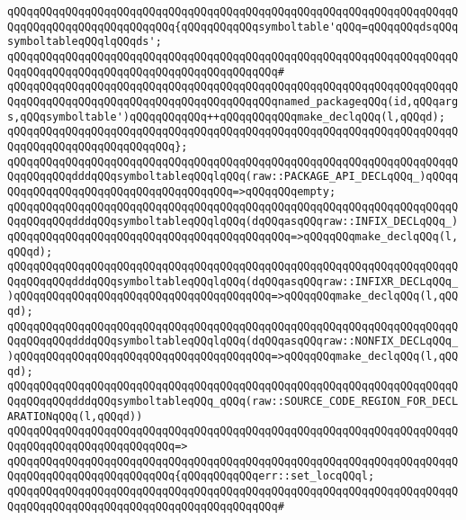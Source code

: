 \verb|qQQqqQQqqQQqqQQqqQQqqQQqqQQqqQQqqQQqqQQqqQQqqQQqqQQqqQQqqQQqqQQqqQQqqQQqqQQqqQQqqQQqqQQqqQQqqQQq{qQQqqQQqqQQqsymboltable'qQQq=qQQqqQQqdsqQQqsymboltableqQQqlqQQqds';|\newline
\verb|qQQqqQQqqQQqqQQqqQQqqQQqqQQqqQQqqQQqqQQqqQQqqQQqqQQqqQQqqQQqqQQqqQQqqQQqqQQqqQQqqQQqqQQqqQQqqQQqqQQqqQQqqQQqqQQq#|\newline
\verb|qQQqqQQqqQQqqQQqqQQqqQQqqQQqqQQqqQQqqQQqqQQqqQQqqQQqqQQqqQQqqQQqqQQqqQQqqQQqqQQqqQQqqQQqqQQqqQQqqQQqqQQqqQQqqQQqnamed_packageqQQq(id,qQQqargs,qQQqsymboltable')qQQqqQQqqQQq++qQQqqQQqqQQqmake_declqQQq(l,qQQqd);|\newline
\verb|qQQqqQQqqQQqqQQqqQQqqQQqqQQqqQQqqQQqqQQqqQQqqQQqqQQqqQQqqQQqqQQqqQQqqQQqqQQqqQQqqQQqqQQqqQQqqQQq};|\newline
\newline
\verb|qQQqqQQqqQQqqQQqqQQqqQQqqQQqqQQqqQQqqQQqqQQqqQQqqQQqqQQqqQQqqQQqqQQqqQQqqQQqqQQqdddqQQqsymboltableqQQqlqQQq(raw::PACKAGE_API_DECLqQQq_)qQQqqQQqqQQqqQQqqQQqqQQqqQQqqQQqqQQqqQQq=>qQQqqQQqempty;|\newline
\verb|qQQqqQQqqQQqqQQqqQQqqQQqqQQqqQQqqQQqqQQqqQQqqQQqqQQqqQQqqQQqqQQqqQQqqQQqqQQqqQQqdddqQQqsymboltableqQQqlqQQq(dqQQqasqQQqraw::INFIX_DECLqQQq_)qQQqqQQqqQQqqQQqqQQqqQQqqQQqqQQqqQQqqQQqqQQq=>qQQqqQQqmake_declqQQq(l,qQQqd);|\newline
\verb|qQQqqQQqqQQqqQQqqQQqqQQqqQQqqQQqqQQqqQQqqQQqqQQqqQQqqQQqqQQqqQQqqQQqqQQqqQQqqQQqdddqQQqsymboltableqQQqlqQQq(dqQQqasqQQqraw::INFIXR_DECLqQQq_)qQQqqQQqqQQqqQQqqQQqqQQqqQQqqQQqqQQqqQQq=>qQQqqQQqmake_declqQQq(l,qQQqd);|\newline
\verb|qQQqqQQqqQQqqQQqqQQqqQQqqQQqqQQqqQQqqQQqqQQqqQQqqQQqqQQqqQQqqQQqqQQqqQQqqQQqqQQqdddqQQqsymboltableqQQqlqQQq(dqQQqasqQQqraw::NONFIX_DECLqQQq_)qQQqqQQqqQQqqQQqqQQqqQQqqQQqqQQqqQQqqQQq=>qQQqqQQqmake_declqQQq(l,qQQqd);|\newline
\newline
\verb|qQQqqQQqqQQqqQQqqQQqqQQqqQQqqQQqqQQqqQQqqQQqqQQqqQQqqQQqqQQqqQQqqQQqqQQqqQQqqQQqdddqQQqsymboltableqQQq_qQQq(raw::SOURCE_CODE_REGION_FOR_DECLARATIONqQQq(l,qQQqd))|\newline
\verb|qQQqqQQqqQQqqQQqqQQqqQQqqQQqqQQqqQQqqQQqqQQqqQQqqQQqqQQqqQQqqQQqqQQqqQQqqQQqqQQqqQQqqQQqqQQqqQQq=>|\newline
\verb|qQQqqQQqqQQqqQQqqQQqqQQqqQQqqQQqqQQqqQQqqQQqqQQqqQQqqQQqqQQqqQQqqQQqqQQqqQQqqQQqqQQqqQQqqQQqqQQq{qQQqqQQqqQQqerr::set_locqQQql;|\newline
\verb|qQQqqQQqqQQqqQQqqQQqqQQqqQQqqQQqqQQqqQQqqQQqqQQqqQQqqQQqqQQqqQQqqQQqqQQqqQQqqQQqqQQqqQQqqQQqqQQqqQQqqQQqqQQqqQQq#|\newline
